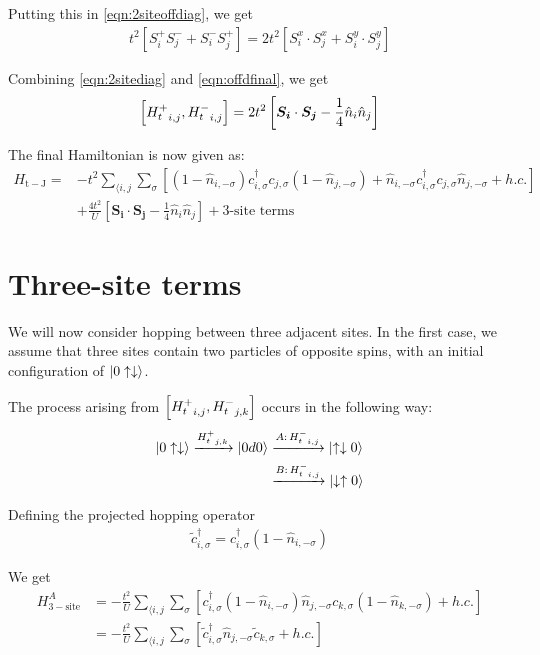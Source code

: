 \documentclass[]{report}
\renewcommand{\vec}{\bm}
\begin{document}
Putting this in \eqref{eqn:2siteoffdiag}, we get
\begin{align}\label{eqn:offdfinal}
t^2 \left[ S^{+}_{i}S^{-}_{j} + S^{-}_{i}S^{+}_{j} \right] = 2 t^2 \left[ S^{x}_i \cdot S^{x}_j + S^{y}_i \cdot S^{y}_j \right]
\end{align}

Combining \eqref{eqn:2sitediag} and \eqref{eqn:offdfinal}, we get
\begin{align}
\comm{ {H^{+}_{t}}_{i,j} }{ {H^{-}_{t}}_{i,j} } = 2 t^2 \left[ \vec{S_{i}} \cdot \vec{S_{j}} - \frac{1}{4} \hat{n}_i \hat{n}_j \right]
\end{align}

The final Hamiltonian is now given as:
\begin{align}\label{eqn:Htj}
\nonumber
H_{\mathrm{t-J}} =& -t^2 \sum_{\langle i,j } \sum_\sigma\left[ (1 - \hat{n}_{i, -\sigma}) c^{\dagger}_{i, \sigma} c_{j, \sigma} (1 - \hat{n}_{j, -\sigma}) + \hat{n}_{i, -\sigma} c^{\dagger}_{i, \sigma} c_{j, \sigma} \hat{n}_{j, -\sigma} + h.c. \right]\\ &+ \frac{4 t^2}{U} \left[ \vec{S_{i}} \cdot \vec{S_{j}} - \frac{1}{4} \hat{n}_i \hat{n}_j \right] + \text{3-site terms}
\end{align}

\section{Three-site terms}
We will now consider hopping between three adjacent sites. In the first case, we assume that three sites contain two particles of opposite spins, with an initial configuration of $ \ket{0\uparrow\downarrow} $.

The process arising from $ \comm{ {H^{+}_{t}}_{i,j} }{ {H^{-}_{t}}_{j,k} } $ occurs in the following way:
\begin{align*}
\ket{0\uparrow\downarrow} \xrightarrow{ {H^{+}_{t}}_{j,k} } \ket{0d0} &\xrightarrow{A:\, {H^{-}_{t}}_{i,j}} \ket{\uparrow \downarrow 0}\\
&\xrightarrow{B:\, {H^{-}_{t}}_{i,j}} \ket{\downarrow \uparrow  0}
\end{align*}

Defining the projected hopping operator
\begin{align}
\tilde{c}^{\dagger}_{i,\sigma} = c^{\dagger}_{i,\sigma} (1 - \hat{n}_{i, -\sigma})
\end{align}

We get
\begin{align}
\nonumber
H^{A}_{\mathrm{3-site}} &= -\frac{t^2}{U} \sum_{\langle i,j } \sum_\sigma \left[ c^{\dagger}_{i, \sigma} (1 - \hat{n}_{i, -\sigma}) \hat{n}_{j, -\sigma} c_{k, \sigma} (1 - \hat{n}_{k, -\sigma}) + h.c.\right]\\
&=
-\frac{t^2}{U} \sum_{\langle i,j } \sum_\sigma \left[ \tilde{c}^{\dagger}_{i, \sigma} \hat{n}_{j, -\sigma} \tilde{c}_{k, \sigma} + h.c. \right]
\end{align}
\end{document}
